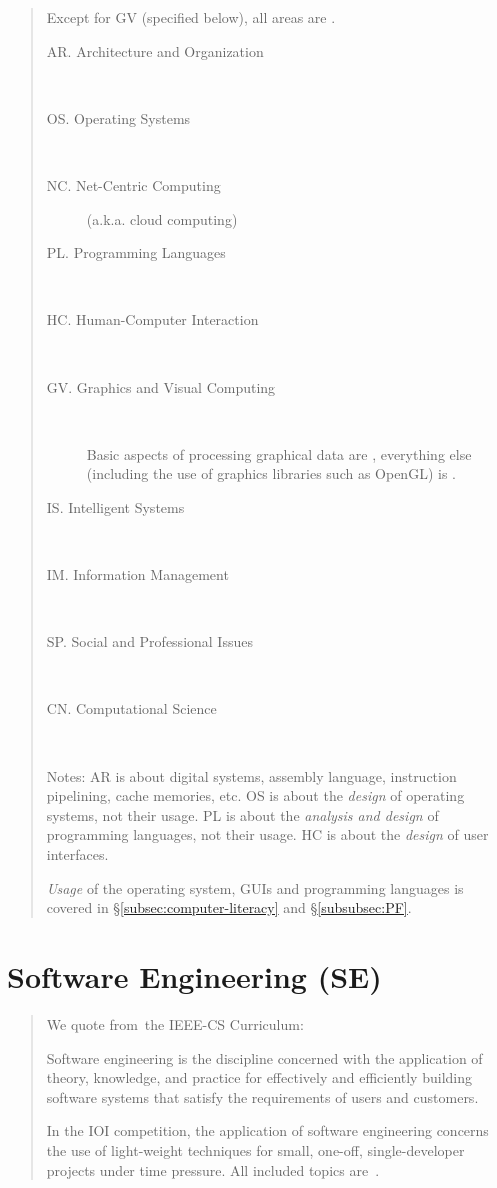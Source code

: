 \documentclass[a4paper,11pt,oneside]{article}
\newcommand{\cmark}{\ding{51}}%
\newcommand{\xmark}{\ding{55}}%
\newcommand{\Ccodeonly}{{\small\cmark\faFileText}}
\newcommand{\Cnofocus}{{\small\faQuestion}}
\newcommand{\Cexcluded}{{\small\xmark}}
\begin{document}
    \begin{quote}
    Except for GV (specified below), all areas are \Cexcluded.

    \begin{description}
    \item[AR. Architecture and Organization] ~
    \item[OS. Operating Systems] ~
    \item[NC. Net-Centric Computing] (a.k.a. cloud computing)
    \item[PL. Programming Languages] ~ 
    \item[HC. Human-Computer Interaction] ~ 
    \item[GV. Graphics and Visual Computing] ~ 
    
    Basic aspects of processing graphical data are \Cnofocus,
    everything else (including the use of graphics libraries such as OpenGL)
    is \Cexcluded.

    \item[IS. Intelligent Systems] ~
    \item[IM. Information Management] ~
    \item[SP. Social and Professional Issues] ~
    \item[CN. Computational Science] ~ 
    \end{description}

    Notes: AR is about digital systems, assembly language, instruction pipelining, cache memories, etc.
    OS is about the \emph{design\/} of operating systems, not their usage.
    PL is about the \emph{analysis and design\/} of programming languages, not their usage.
    HC is about the \emph{design\/} of user interfaces.

    \emph{Usage} of the operating system, GUIs and programming languages is 
    covered in \S\ref{subsec:computer-literacy} and \S\ref{subsubsec:PF}.
    \end{quote}

\section {Software Engineering (SE)}%
\label{subsec:software-engineering}

    \begin{quote}
    We quote from~the IEEE-CS Curriculum:

    {\sffamily\footnotesize
    Software engineering is the discipline concerned with the application of theory,
    knowledge, and practice for effectively and efficiently building software systems
    that satisfy the requirements of users and customers.
    }

    In the IOI competition,
    the application of software engineering concerns the use of light-weight techniques
    for small, one-off, single-developer projects under time pressure.
    All included topics are~\Ccodeonly.
    \end{quote}
\end{document}
